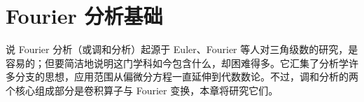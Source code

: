 \documentclass[../main.tex]{subfiles}
\begin{document}
\chapter{Fourier 分析基础}\label{chapter:ch08-fourier-analysis}
说 Fourier 分析（或调和分析）起源于 Euler、Fourier 等人对三角级数的研究，是容易的；但要简洁地说明这门学科如今包含什么，却困难得多。它汇集了分析学许多分支的思想，应用范围从偏微分方程一直延伸到代数数论。不过，调和分析的两个核心组成部分是卷积算子与 Fourier 变换，本章将研究它们。


\end{document}
